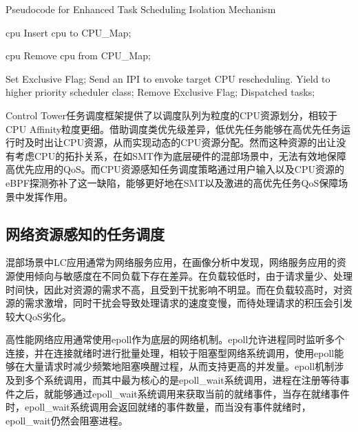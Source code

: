 \begin{algorithm}[H]
    \caption{Pseudocode for Enhanced Task Scheduling Isolation Mechanism}
    \label{alg:cpu_aware_sched}
    \begin{algorithmic}[1]
    
     {cpu}
    \State Insert cpu to CPU\_Map;
    \EndFunction
    
     {cpu}
    \State Remove cpu from CPU\_Map;
    \EndFunction
    
                \State Set Exclusive Flag;
                    \State Send an IPI to envoke target CPU rescheduling.
                \EndFor
                \State Yield to higher priority scheduler class;
            \EndIf
            \State Remove Exclusive Flag;
            \State Dispatched tasks;
        \EndWhile
    \EndFunction
    \end{algorithmic}
\end{algorithm}

Control Tower任务调度框架提供了以调度队列为粒度的CPU资源划分，相较于CPU Affinity粒度更细。借助调度类优先级差异，低优先任务能够在高优先任务运行时及时出让CPU资源，从而实现动态的CPU资源分配。然而这种资源的出让没有考虑CPU的拓扑关系，在如SMT作为底层硬件的混部场景中，无法有效地保障高优先应用的QoS。而CPU资源感知任务调度策略通过用户输入以及CPU资源的eBPF探测弥补了这一缺陷，能够更好地在SMT以及激进的高优先任务QoS保障场景中发挥作用。

\subsection{网络资源感知的任务调度}


混部场景中LC应用通常为网络服务应用，在画像分析中发现，网络服务应用的资源使用倾向与敏感度在不同负载下存在差异。在负载较低时，由于请求量少、处理时间快，因此对资源的需求不高，且受到干扰影响不明显。而在负载较高时，对资源的需求激增，同时干扰会导致处理请求的速度变慢，而待处理请求的积压会引发较大QoS劣化。

高性能网络应用通常使用epoll作为底层的网络机制。epoll允许进程同时监听多个连接，并在连接就绪时进行批量处理，相较于阻塞型网络系统调用，使用epoll能够在大量请求时减少频繁地阻塞唤醒过程，从而支持更高的并发量。epoll机制涉及到多个系统调用，而其中最为核心的是epoll\_wait系统调用，进程在注册等待事件之后，就能够通过epoll\_wait系统调用来获取当前的就绪事件，当存在就绪事件时，epoll\_wait系统调用会返回就绪的事件数量，而当没有事件就绪时，epoll\_wait仍然会阻塞进程。

